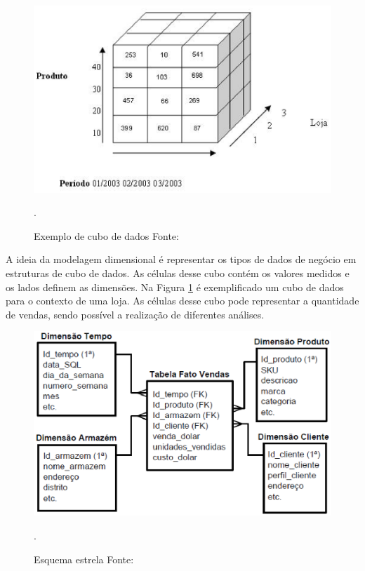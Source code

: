  \begin{figure}[!htb]
 	\centering
 		\includegraphics[scale=0.8]{figuras/dw-cubo}
 		\caption{Exemplo de cubo de dados Fonte: \cite{Guimaraes2012}}.
 		\label{dw-cube}
 \end{figure}

A ideia da modelagem dimensional é representar os tipos de dados de negócio em estruturas de cubo de dados. As células desse cubo contém os valores medidos e os lados definem as dimensões. Na Figura \ref{dw-cube} é exemplificado um cubo de dados para o contexto de uma loja. As células desse cubo pode representar a quantidade de vendas, sendo possível a realização de diferentes análises.

 \begin{figure}[!htb]
 	\centering
 		\includegraphics[scale=0.8]{figuras/dw-Modelo-estrela}
 		\caption{Esquema estrela Fonte: \cite{Wagner2012}}.
 		\label{dw-starscheme}
 \end{figure}

